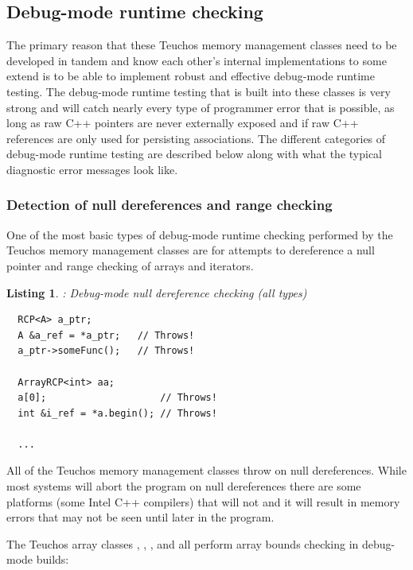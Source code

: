 \documentclass[pdf,ps2pdf,11pt]{SANDreport}
\newtheorem{listing}{Listing}
\begin{document}
%
{}\subsection{Debug-mode runtime checking}
\label{sec:debug-mode-runtime-checking}
%

The primary reason that these Teuchos memory management classes need
to be developed in tandem and know each other's internal
implementations to some extend is to be able to implement robust and
effective debug-mode runtime testing.  The debug-mode runtime testing
that is built into these classes is very strong and will catch nearly
every type of programmer error that is possible, as long as raw C++
pointers are never externally exposed and if raw C++ references are
only used for persisting associations.  The different categories of
debug-mode runtime testing are described below along with what the
typical diagnostic error messages look like.


%
{}\subsubsection{Detection of null dereferences and range checking}
\label{sec:null-dereferences-range-checking}
%

One of the most basic types of debug-mode runtime checking performed
by the Teuchos memory management classes are for attempts to
dereference a null pointer and range checking of arrays and iterators.

\begin{listing}: Debug-mode null dereference checking (all types) \\
\label{listing:null-deref}
{\small\begin{verbatim}
  RCP<A> a_ptr;
  A &a_ref = *a_ptr;   // Throws!
  a_ptr->someFunc();   // Throws!

  ArrayRCP<int> aa;
  a[0];                    // Throws!
  int &i_ref = *a.begin(); // Throws!

  ...  
\end{verbatim}}
\end{listing}

All of the Teuchos memory management classes throw on null
dereferences.  While most systems will abort the program on null
dereferences there are some platforms (some Intel C++ compilers) that
will not and it will result in memory errors that may not be seen
until later in the program.

The Teuchos array classes {}, {},
{}, and {} all perform array bounds
checking in debug-mode builds:
\end{document}
